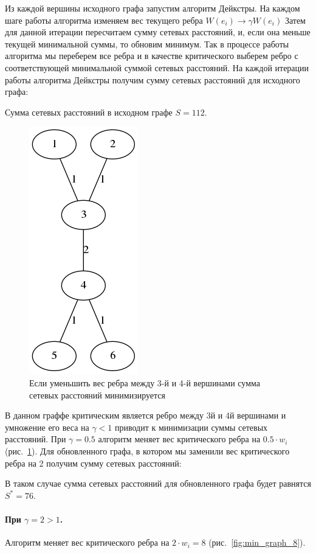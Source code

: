 \documentclass[12pt]{article}
\begin{document}
Из каждой вершины исходного графа запустим алгоритм Дейкстры.
На каждом шаге работы алгоритма изменяем вес текущего ребра $W(e_i) \rightarrow \gamma W(e_i)$
Затем для данной итерации пересчитаем сумму сетевых расстояний, и, если она меньше текущей минимальной суммы,
то обновим минимум. Так в процессе работы алгоритма мы переберем все ребра и в качестве критического выберем 
ребро с соответствующей минимальной суммой сетевых расстояний. 
На каждой итерации работы алгоритма Дейкстры получим сумму сетевых расстояний для исходного графа:

Сумма сетевых расстояний в исходном графе $S = 112$. 

\begin{figure}[h]
    \centering
    \includegraphics[scale=0.7]{min_graph_2.png}
    \caption{Если уменьшить вес ребра между 3-й и 4-й вершинами сумма сетевых расстояний минимизируется}
    \label{fig:min_graph_2}
\end{figure}

В данном граффе критическим является ребро между
3й и 4й вершинами и умножение его веса на
$\gamma < 1$ приводит к минимизации суммы сетевых расстояний.
При $\gamma = 0.5$ алгоритм меняет вес критического ребра на $0.5 \cdot w_i$ (рис.~\ref{fig:min_graph_2}).
Для обновленного графа, в котором мы заменили вес критического ребра на 2 получим сумму сетевых расстояний:

В таком случае сумма сетевых расстояний для обновленного графа будет равнятся $S^* = 76$.

\paragraph{При $\gamma = 2 > 1$.}
Алгоритм меняет вес критического ребра на $2 \cdot w_i = 8$ (рис.~\ref{fig:min_graph_8}).
\end{document}
